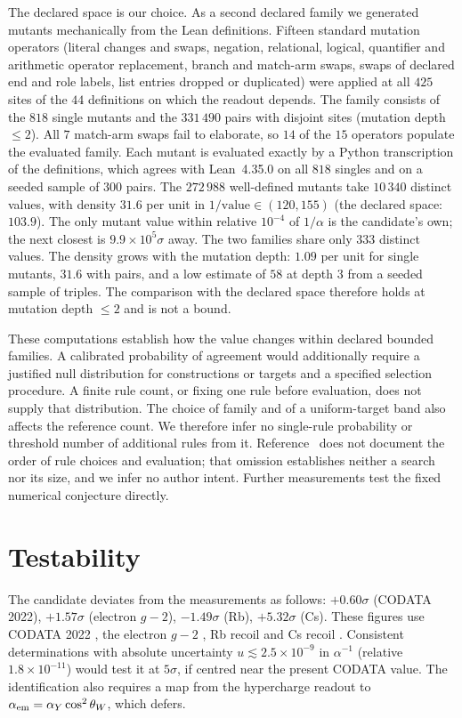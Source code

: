\documentclass[11pt]{article}
\theoremstyle{remark}
\begin{document}
The declared space is our choice. As a second declared family we generated mutants mechanically from the Lean definitions. Fifteen standard mutation operators (literal changes and swaps, negation, relational, logical, quantifier and arithmetic operator replacement, branch and match-arm swaps, swaps of declared end and role labels, list entries dropped or duplicated) were applied at all $425$ sites of the $44$ definitions on which the readout depends. The family consists of the $818$ single mutants and the $331\,490$ pairs with disjoint sites (mutation depth $\le2$). All $7$ match-arm swaps fail to elaborate, so $14$ of the $15$ operators populate the evaluated family. Each mutant is evaluated exactly by a Python transcription of the definitions, which agrees with Lean~4.35.0 on all $818$ singles and on a seeded sample of $300$ pairs. The $272\,988$ well-defined mutants take $10\,340$ distinct values, with density $31.6$ per unit in $1/\text{value}\in(120,155)$ (the declared space: $103.9$). The only mutant value within relative $10^{-4}$ of $1/\alpha$ is the candidate's own; the next closest is $9.9\times10^5\sigma$ away. The two families share only $333$ distinct values. The density grows with the mutation depth: $1.09$ per unit for single mutants, $31.6$ with pairs, and a low estimate of $58$ at depth $3$ from a seeded sample of triples. The comparison with the declared space therefore holds at mutation depth $\le2$ and is not a bound.

These computations establish how the value changes within declared bounded families. A calibrated probability of agreement would additionally require a justified null distribution for constructions or targets and a specified selection procedure. A finite rule count, or fixing one rule before evaluation, does not supply that distribution. The choice of family and of a uniform-target band also affects the reference count. We therefore infer no single-rule probability or threshold number of additional rules from it. Reference~\cite{wg} does not document the order of rule choices and evaluation; that omission establishes neither a search nor its size, and we infer no author intent. Further measurements test the fixed numerical conjecture directly.

\section{Testability}
The candidate deviates from the measurements as follows: $+0.60\sigma$ (CODATA 2022), $+1.57\sigma$ (electron $g-2$), $-1.49\sigma$ (Rb), $+5.32\sigma$ (Cs). These figures use CODATA 2022 \cite{codata}, the electron $g-2$ \cite{fan}, Rb recoil \cite{morel} and Cs recoil \cite{parker}. Consistent determinations with absolute uncertainty $u\lesssim2.5\times10^{-9}$ in $\alpha^{-1}$ (relative $1.8\times10^{-11}$) would test it at $5\sigma$, if centred near the present CODATA value. The identification also requires a map from the hypercharge readout to $\alpha_{\rm em}=\alpha_Y\cos^2\theta_W$, which \cite{wg} defers.
\end{document}
